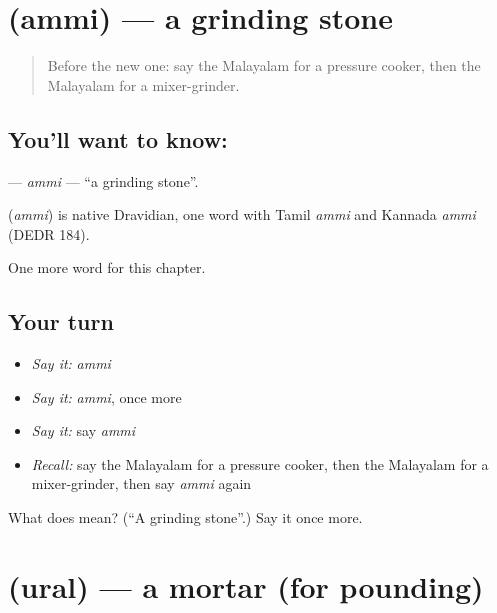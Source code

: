 \section[\texorpdfstring{\ml{അമ്മി} (ammi)}{അമ്മി (ammi)}]{ (ammi) — a grinding stone}

\label{lesson:ML-C295-ammi}



\begin{quote}
Before the new one: say the Malayalam for a pressure cooker, then the Malayalam for a mixer-grinder.
\end{quote}

\subsection*{You'll want to know: }
\textbf{} — \emph{ammi} — \textquotedblleft{}a grinding stone\textquotedblright{}.

\begin{cousinweb}
\textbf{} (\emph{ammi}) is native Dravidian, one word with Tamil \emph{ammi} and Kannada \emph{ammi} (DEDR 184).
\end{cousinweb}

\begin{grammarlens}[title={What you've built}]
One more word for this chapter.
\end{grammarlens}

\subsection*{Your turn}
\begin{itemize}
\raggedright
  \item \emph{Say it:} \emph{ammi}
  \item \emph{Say it:} \emph{ammi}, once more
  \item \emph{Say it:} say \emph{ammi}
  \item \emph{Recall:} say the Malayalam for a pressure cooker, then the Malayalam for a mixer-grinder, then say \emph{ammi} again
\end{itemize}

\begin{tcolorbox}[breakable,colback=teal!4,colframe=teal!35!black,title={Before you move on}]
What does  mean? (\textquotedblleft{}A grinding stone\textquotedblright{}.) Say it once more.
\end{tcolorbox}
\section[\texorpdfstring{\ml{ഉരൽ} (ural)}{ഉരൽ (ural)}]{ (ural) — a mortar (for pounding)}

